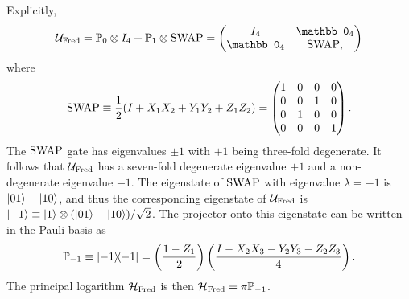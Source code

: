 Explicitly,
\begin{equation}
    \UFred = \PP_0 \otimes I_4 + \PP_1 \otimes \on{SWAP} =
    \begin{pmatrix}
        I_4 & \mathbb0_4 \\
        \mathbb0_4 & \on{SWAP},
    \end{pmatrix}
\end{equation}
where
\begin{equation}
    \operatorname{SWAP} \equiv
    \frac{1}{2}(I + X_1 X_2 + Y_1 Y_2 + Z_1 Z_2) =
    \begin{pmatrix}
        1 & 0 & 0 & 0 \\
        0 & 0 & 1 & 0 \\
        0 & 1 & 0 & 0 \\
        0 & 0 & 0 & 1
    \end{pmatrix}.
\end{equation}
The $\operatorname{SWAP}$ gate has eigenvalues $\pm1$ with $+1$ being three-fold degenerate.
It follows that $\mathcal{U}_{\operatorname{Fred}}$ has a seven-fold degenerate eigenvalue $+1$ and a non-degenerate eigenvalue $-1$.
The eigenstate of $\operatorname{SWAP}$ with eigenvalue $\lambda=-1$ is $\ket{01}-\ket{10}$, and thus the corresponding eigenstate of $\mathcal{U}_{\operatorname{Fred}}$ is $\ket{-1}\equiv\ket1\otimes(\ket{01}-\ket{10})/\sqrt2$.
The projector onto this eigenstate can be written in the Pauli basis as
\begin{equation}
    \mathbb{P}_{-1}\equiv \ketbra{-1} =
    \left(\frac{1-Z_1}{2}\right)
    \left(\frac{I - X_2 X_3 - Y_2 Y_3 - Z_2 Z_3}{4}\right).
    \label{eq:fredkin_projector_negeigspace}
\end{equation}
The principal logarithm $\mathcal{H}_{\operatorname{Fred}}$ is then
$\mathcal{H}_{\operatorname{Fred}} = \pi\mathbb{P}_{-1}$.

